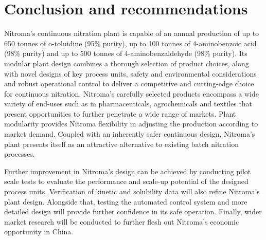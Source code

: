 \section*{Conclusion and recommendations}
Nitroma's continuous nitration plant is capable of an annual production of up to 650 tonnes of o-toluidine (95\% purity), up to 100 tonnes of 4-aminobenzoic acid (98\% purity) and up to 500 tonnes of 4-aminobenzaldehyde (98\% purity). Its modular plant design combines a thorough selection of product choices, along with novel designs of key process units, safety and environmental considerations and robust operational control to deliver a competitive and cutting-edge choice for continuous nitration. Nitroma's carefully selected products encompass a wide variety of end-uses such as in pharmaceuticals, agrochemicals and textiles that present opportunities to further penetrate a wide range of markets. Plant modularity provides Nitroma flexibility in adjusting the production according to market demand. Coupled with an inherently safer continuous design, Nitroma's plant presents itself as an attractive alternative to existing batch nitration processes.

Further improvement in Nitroma's design can be achieved by conducting pilot scale tests to evaluate the performance and scale-up potential of the designed process units. Verification of kinetic and solubility data will also refine Nitroma's plant design. Alongside that, testing the automated control system and more detailed design will provide further confidence in its safe operation. Finally, wider market research will be conducted to further flesh out Nitroma's economic opportunity in China.

